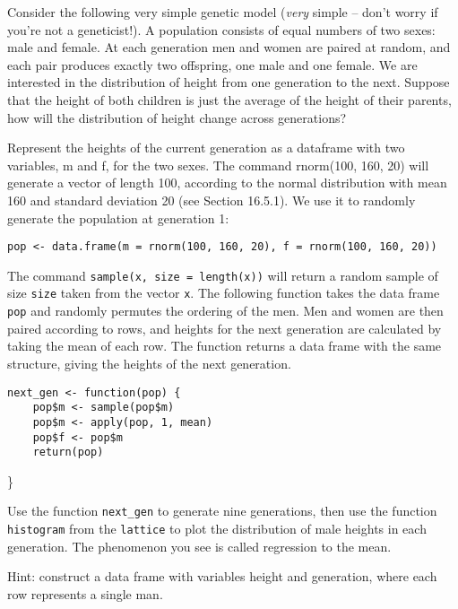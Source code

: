 \documentclass[]{article}
\begin{document}
Consider the following very simple genetic model (\emph{very} simple --
don't worry if you're not a geneticist!). A population consists of equal
numbers of two sexes: male and female. At each generation men and women
are paired at random, and each pair produces exactly two offspring, one
male and one female. We are interested in the distribution of height
from one generation to the next. Suppose that the height of both
children is just the average of the height of their parents, how will
the distribution of height change across generations?

Represent the heights of the current generation as a dataframe with two
variables, m and f, for the two sexes. The command rnorm(100, 160, 20)
will generate a vector of length 100, according to the normal
distribution with mean 160 and standard deviation 20 (see Section
16.5.1). We use it to randomly generate the population at generation 1:

\begin{verbatim}
pop <- data.frame(m = rnorm(100, 160, 20), f = rnorm(100, 160, 20))
\end{verbatim}

The command \texttt{sample(x, size = length(x))} will return a random
sample of size \texttt{size} taken from the vector \texttt{x}. The
following function takes the data frame \texttt{pop} and randomly
permutes the ordering of the men. Men and women are then paired
according to rows, and heights for the next generation are calculated by
taking the mean of each row. The function returns a data frame with the
same structure, giving the heights of the next generation.

\begin{verbatim}
next_gen <- function(pop) {
    pop$m <- sample(pop$m)
    pop$m <- apply(pop, 1, mean)
    pop$f <- pop$m
    return(pop)
\end{verbatim}

\}

Use the function \texttt{next\_gen} to generate nine generations, then
use the function \texttt{histogram} from the \texttt{lattice} to plot
the distribution of male heights in each generation. The phenomenon you
see is called regression to the mean.

Hint: construct a data frame with variables height and generation, where
each row represents a single man.
\end{document}
